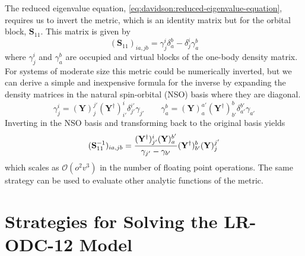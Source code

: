 The reduced eigenvalue equation, \cref{eq:davidson:reduced-eigenvalue-equation},
requires us to invert the metric, which is an identity matrix but for the
orbital block, \(\mathbf{S}_{11}\).
This matrix is given by
\begin{equation}
    (\mathbf{S}_{11})_{ia,jb}
    =
    \gamma^i_j
    \delta_a^b
    -
    \delta_j^i
    \gamma^b_a
\end{equation}
where
\(
    \gamma_j^i
\)
and
\(
    \gamma_a^b
\)
are occupied and virtual blocks of the one-body density matrix.
For systems of moderate size this metric could be numerically inverted, but we
can derive a simple and inexpensive formula for the inverse by expanding the
density matrices in the natural spin-orbital (NSO) basis where they are
diagonal.
\begin{equation}
    \gamma_j^i
    =
    (\mathbf{Y})_j^{j'}
    (\mathbf{Y}^\dagger)_{i'}^i
    \delta_{j'}^{i'}
    \gamma_{j'}
    \qquad
    \gamma_a^b
    =
    (\mathbf{Y})_a^{a'}
    (\mathbf{Y}^\dagger)_{b'}^b
    \delta_{a'}^{b'}
    \gamma_{a'}
\end{equation}
Inverting in the NSO basis and transforming back to the original basis yields
\begin{equation}
    (\mathbf{S}_{11}^{-1})_{ia,jb}
    =
    \frac{%
        (\mathbf{Y}^\dagger)_{j'}^i
        (\mathbf{Y})_a^{b'}
    }{%
        \gamma_{j'}-\gamma_{b'}
    }
    (\mathbf{Y}^\dagger)_{b'}^b
    (\mathbf{Y})_j^{j'}
\end{equation}
which scales as \(\mathcal{O}(o^2v^3)\) in the number of floating point
operations.
The same strategy can be used to evaluate other analytic functions of the
metric.


\section{Strategies for Solving the LR-ODC-12 Model}
\label{sec:davidson:strategies}


